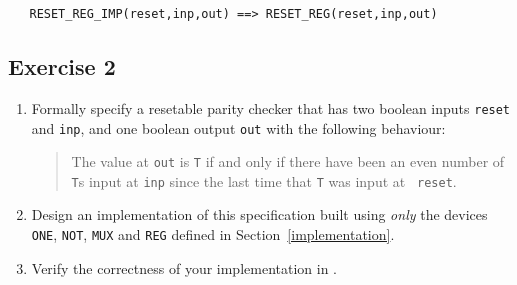 {\small\begin{verbatim}
   RESET_REG_IMP(reset,inp,out) ==> RESET_REG(reset,inp,out)
\end{verbatim}}


\subsection{Exercise 2}

\begin{enumerate}
\item Formally specify a resetable parity checker that has two boolean
  inputs {\small\tt reset} and {\small\tt inp}, and one boolean output
  {\small\tt out} with the following behaviour:
  \begin{quote}
    The value at {\small\tt out} is {\small\tt T} if and only if there
    have been an even number of {\small\tt T}s input at {\small\tt inp}
    since the last time that {\small\tt T} was input at {\small\tt
      reset}.
  \end{quote}
\item Design an implementation of this specification built using {\it
    only\/} the devices {\small\verb|ONE|}, {\small\verb|NOT|},
  {\small\verb|MUX|} and {\small\verb|REG|} defined in
  Section~\ref{implementation}.
\item Verify the correctness of your implementation in \HOL.
\end{enumerate}

